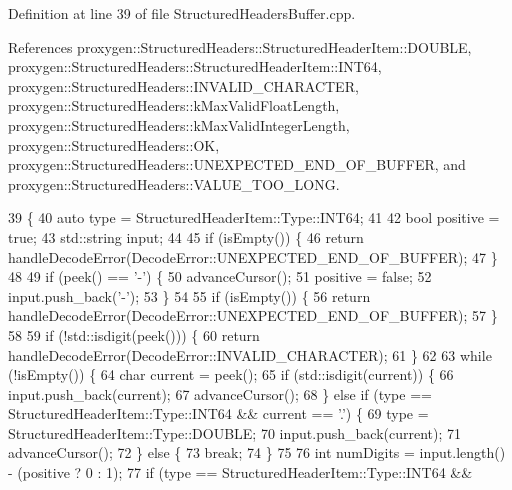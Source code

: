 Definition at line 39 of file Structured\+Headers\+Buffer.\+cpp.



References proxygen\+::\+Structured\+Headers\+::\+Structured\+Header\+Item\+::\+D\+O\+U\+B\+LE, proxygen\+::\+Structured\+Headers\+::\+Structured\+Header\+Item\+::\+I\+N\+T64, proxygen\+::\+Structured\+Headers\+::\+I\+N\+V\+A\+L\+I\+D\+\_\+\+C\+H\+A\+R\+A\+C\+T\+ER, proxygen\+::\+Structured\+Headers\+::k\+Max\+Valid\+Float\+Length, proxygen\+::\+Structured\+Headers\+::k\+Max\+Valid\+Integer\+Length, proxygen\+::\+Structured\+Headers\+::\+OK, proxygen\+::\+Structured\+Headers\+::\+U\+N\+E\+X\+P\+E\+C\+T\+E\+D\+\_\+\+E\+N\+D\+\_\+\+O\+F\+\_\+\+B\+U\+F\+F\+ER, and proxygen\+::\+Structured\+Headers\+::\+V\+A\+L\+U\+E\+\_\+\+T\+O\+O\+\_\+\+L\+O\+NG.


\begin{DoxyCode}
39                                                                              \{
40   \textcolor{keyword}{auto} type = StructuredHeaderItem::Type::INT64;
41 
42   \textcolor{keywordtype}{bool} positive = \textcolor{keyword}{true};
43   std::string input;
44 
45   \textcolor{keywordflow}{if} (isEmpty()) \{
46     \textcolor{keywordflow}{return} handleDecodeError(DecodeError::UNEXPECTED\_END\_OF\_BUFFER);
47   \}
48 
49   \textcolor{keywordflow}{if} (peek() == \textcolor{charliteral}{'-'}) \{
50     advanceCursor();
51     positive = \textcolor{keyword}{false};
52     input.push\_back(\textcolor{charliteral}{'-'});
53   \}
54 
55   \textcolor{keywordflow}{if} (isEmpty()) \{
56     \textcolor{keywordflow}{return} handleDecodeError(DecodeError::UNEXPECTED\_END\_OF\_BUFFER);
57   \}
58 
59   \textcolor{keywordflow}{if} (!std::isdigit(peek())) \{
60     \textcolor{keywordflow}{return} handleDecodeError(DecodeError::INVALID\_CHARACTER);
61   \}
62 
63   \textcolor{keywordflow}{while} (!isEmpty()) \{
64     \textcolor{keywordtype}{char} current = peek();
65     \textcolor{keywordflow}{if} (std::isdigit(current)) \{
66       input.push\_back(current);
67       advanceCursor();
68     \} \textcolor{keywordflow}{else} \textcolor{keywordflow}{if} (type == StructuredHeaderItem::Type::INT64 && current == \textcolor{charliteral}{'.'}) \{
69       type = StructuredHeaderItem::Type::DOUBLE;
70       input.push\_back(current);
71       advanceCursor();
72     \} \textcolor{keywordflow}{else} \{
73       \textcolor{keywordflow}{break};
74     \}
75 
76     \textcolor{keywordtype}{int} numDigits = input.length() - (positive ? 0 : 1);
77     \textcolor{keywordflow}{if} (type == StructuredHeaderItem::Type::INT64 &&

\end{DoxyCode}
